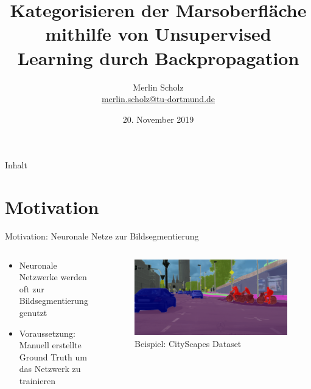\documentclass[9pt]{beamer}
\author[Merlin Scholz]{Merlin Scholz\\\href{mailto:merlin.scholz@tu-dortmund.de}{merlin.scholz@tu-dortmund.de}}
\title[Analyse der Marsoberfläche durch Unsupervised Learning]{Kategorisieren der Marsoberfläche mithilfe von Unsupervised Learning durch Backpropagation}
\date[20.11.2019]{20. November 2019}
\institute[TU Dortmund]{Mustererkennung,\\Informatik XII, Technische Universität Dortmund}
\begin{document}
	
\begin{frame}
	
	\titlepage
	
	
	
\end{frame}

\begin{frame}{Inhalt}
	\tableofcontents
\end{frame}

\section{Motivation}

\begin{frame}{Motivation: Neuronale Netze zur Bildsegmentierung}
\begin{columns}
	\begin{column}{.5\textwidth}
		\begin{itemize}
			\item Neuronale Netzwerke werden oft zur Bildsegmentierung genutzt
			\item Voraussetzung: Manuell erstellte Ground Truth um das Netzwerk zu trainieren
			\end{itemize}
	\end{column}
	\begin{column}{.5\textwidth}
		\begin{figure}[H]
			\includegraphics[width=\textwidth,keepaspectratio]{koeln00.png}
			\caption{Beispiel: CityScapes Dataset\footnotemark[1] }
		\end{figure}
	\end{column}
\end{columns}
\end{frame}
\end{document}

